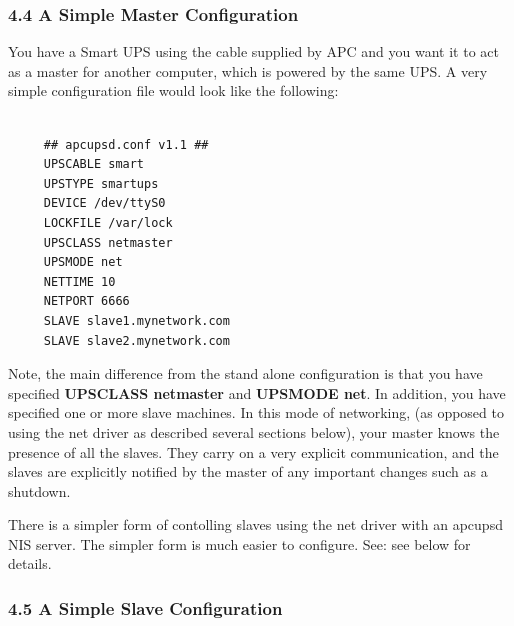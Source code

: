 \label{A-Simple-Master-Configuration}

\subsubsection*{4.4 A Simple Master Configuration}

\label{index-Configuration_002c-Master-74}
\label{index-Master_002c-config-example-75}
\label{index-Example_002c-Master-conf-76}
You have a Smart UPS using the cable supplied by APC and you want it to act as
a master for another computer, which is powered by the same UPS. A very simple
configuration file would look like the following: 

\footnotesize
\begin{verbatim}
     
     ## apcupsd.conf v1.1 ##
     UPSCABLE smart
     UPSTYPE smartups
     DEVICE /dev/ttyS0
     LOCKFILE /var/lock
     UPSCLASS netmaster
     UPSMODE net
     NETTIME 10
     NETPORT 6666
     SLAVE slave1.mynetwork.com
     SLAVE slave2.mynetwork.com
\end{verbatim}
\normalsize

Note, the main difference from the stand alone configuration is that you have
specified {\bf UPSCLASS netmaster} and {\bf UPSMODE net}.  In addition, you
have specified one or more slave machines.  In this mode of networking, (as
opposed to using the net driver as described several sections below), your
master knows the presence of all the slaves.  They carry on a very explicit
communication, and the slaves are explicitly notified by the master of any
important changes such as a shutdown.  

There is a simpler form of contolling slaves using the net driver with an
apcupsd NIS server. The simpler form is much easier to configure. See: see 
below for details. 

\label{A-Simple-Slave-Configuration}

\subsubsection*{4.5 A Simple Slave Configuration}


